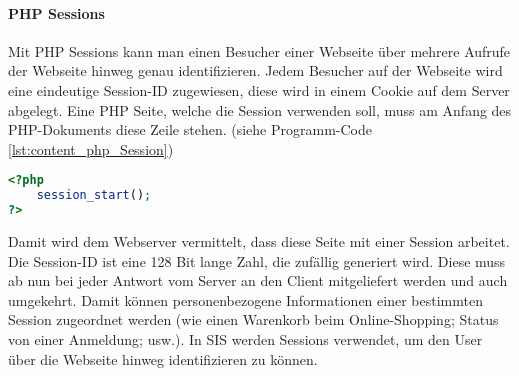 \paragraph{PHP Sessions\\}
Mit PHP Sessions kann man einen Besucher einer Webseite über mehrere Aufrufe der Webseite hinweg genau identifizieren. Jedem Besucher auf der Webseite wird eine eindeutige Session-ID zugewiesen, diese wird in einem Cookie auf dem Server abgelegt. Eine PHP Seite, welche die Session verwenden soll, muss am Anfang des PHP-Dokuments diese Zeile stehen. (siehe Programm-Code \ref{lst:content_php_Session})
\begin{lstlisting}[style=custom, language=PHP, caption={Session-Start},label={lst:content_php_Session}]
<?php
	session_start();
?>
\end{lstlisting}

Damit wird dem Webserver vermittelt, dass diese Seite mit einer Session arbeitet.\\
Die Session-ID ist eine 128 Bit lange Zahl, die zufällig generiert wird. Diese muss ab nun bei jeder Antwort vom Server an den Client mitgeliefert werden und auch umgekehrt. Damit können personenbezogene Informationen einer bestimmten Session zugeordnet werden (wie einen Warenkorb beim Online-Shopping; Status von einer Anmeldung; usw.). In SIS werden Sessions verwendet, um den User über die Webseite hinweg identifizieren zu können. 
